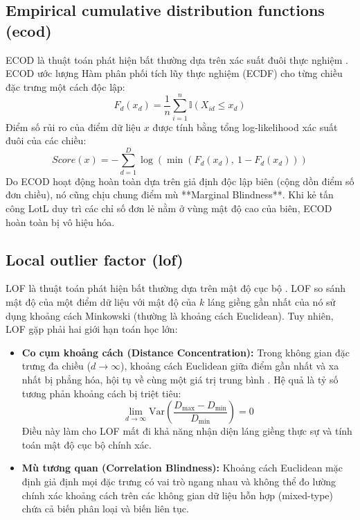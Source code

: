 ﻿\documentclass[../main.tex]{subfiles}
\begin{document}
\subsection{Empirical cumulative distribution functions (ecod)}
ECOD là thuật toán phát hiện bất thường dựa trên xác suất đuôi thực nghiệm \cite{li2023ecod}. ECOD ước lượng Hàm phân phối tích lũy thực nghiệm (ECDF) cho từng chiều đặc trưng một cách độc lập:
\begin{equation}
    F_{d}(x_d) = \frac{1}{n} \sum_{i=1}^{n} \mathbb{I}(X_{id} \le x_d)
\end{equation}
Điểm số rủi ro của điểm dữ liệu $x$ được tính bằng tổng log-likelihood xác suất đuôi của các chiều:
\begin{equation}
    Score(x) = -\sum_{d=1}^{D} \log\left( \min(F_{d}(x_d),\ 1 - F_{d}(x_d)) \right)
\end{equation}
Do ECOD hoạt động hoàn toàn dựa trên giả định độc lập biên (cộng dồn điểm số đơn chiều), nó cũng chịu chung điểm mù **Marginal Blindness**. Khi kẻ tấn công LotL duy trì các chỉ số đơn lẻ nằm ở vùng mật độ cao của biên, ECOD hoàn toàn bị vô hiệu hóa.

\subsection{Local outlier factor (lof)}
LOF là thuật toán phát hiện bất thường dựa trên mật độ cục bộ \cite{breunig2000lof}. LOF so sánh mật độ của một điểm dữ liệu với mật độ của $k$ láng giềng gần nhất của nó sử dụng khoảng cách Minkowski (thường là khoảng cách Euclidean). Tuy nhiên, LOF gặp phải hai giới hạn toán học lớn:
\begin{itemize}
    \item \textbf{Co cụm khoảng cách (Distance Concentration):} Trong không gian đặc trưng đa chiều ($d \to \infty$), khoảng cách Euclidean giữa điểm gần nhất và xa nhất bị phẳng hóa, hội tụ về cùng một giá trị trung bình \cite{francois2007concentration}. Hệ quả là tỷ số tương phản khoảng cách bị triệt tiêu:
    \begin{equation}
        \lim_{d \to \infty} \text{Var}\left( \frac{D_{\max} - D_{\min}}{D_{\min}} \right) = 0
    \end{equation}
    Điều này làm cho LOF mất đi khả năng nhận diện láng giềng thực sự và tính toán mật độ cục bộ chính xác.
    \item \textbf{Mù tương quan (Correlation Blindness):} Khoảng cách Euclidean mặc định giả định mọi đặc trưng có vai trò ngang nhau và không thể đo lường chính xác khoảng cách trên các không gian dữ liệu hỗn hợp (mixed-type) chứa cả biến phân loại và biến liên tục.
\end{itemize}
\end{document}
